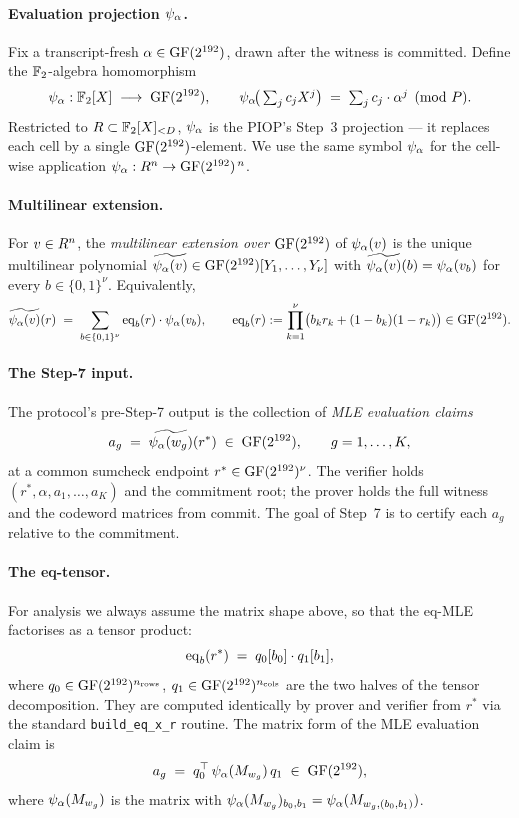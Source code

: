 \paragraph{Evaluation projection $\psi_{\alpha}$.} Fix a transcript-fresh
$\alpha \in \mathrm{GF}(2^{192})$, drawn after the witness is committed. Define the
$\mathbb{F}_2$-algebra homomorphism
\[
  \psi_{\alpha} : \mathbb{F}_2[X] \;\longrightarrow\; \mathrm{GF}(2^{192}),
  \qquad
  \psi_{\alpha}\!\big(\textstyle\sum_j c_j X^j\big) \;=\; \sum_j c_j \cdot \alpha^j \pmod{P}.
\]
Restricted to $R \subset \mathbb{F}_2[X]_{<D}$, $\psi_{\alpha}$ is the
PIOP's Step~3 projection — it replaces each cell by a single
$\mathrm{GF}(2^{192})$-element. We use the same symbol $\psi_{\alpha}$ for the cell-wise
application $\psi_{\alpha} : R^n \to \mathrm{GF}(2^{192})^{\,n}$.

\paragraph{Multilinear extension.} For $v \in R^n$, the
\emph{multilinear extension over $\mathrm{GF}(2^{192})$} of $\psi_{\alpha}(v)$ is the
unique multilinear polynomial $\widetilde{\psi_{\alpha}(v)} \in \mathrm{GF}(2^{192})[Y_1,\ldots,Y_\nu]$
with $\widetilde{\psi_{\alpha}(v)}(b) = \psi_{\alpha}(v_b)$ for every $b \in \{0,1\}^\nu$.
Equivalently,
\[
  \widetilde{\psi_{\alpha}(v)}(r) \;=\; \sum_{b \in \{0,1\}^\nu} \operatorname{eq}_b(r) \cdot \psi_{\alpha}(v_b),
  \qquad
  \operatorname{eq}_b(r) := \prod_{k=1}^\nu \bigl(b_k r_k + (1 - b_k)(1 - r_k)\bigr) \in \mathrm{GF}(2^{192}).
\]

\paragraph{The Step-7 input.} The protocol's pre-Step-7 output is the
collection of \emph{MLE evaluation claims}
\[
  a_g \;=\; \widetilde{\psi_{\alpha}(w_g)}(r^*) \;\in\; \mathrm{GF}(2^{192}),
  \qquad g = 1,\ldots,K,
\]
at a common sumcheck endpoint $r^* \in \mathrm{GF}(2^{192})^{\nu}$. The verifier
holds $(r^*, \alpha, a_1, \ldots, a_K)$ and the commitment root; the
prover holds the full witness and the codeword matrices from commit.
The goal of Step~7 is to certify each $a_g$ relative to the
commitment.

\paragraph{The eq-tensor.} For analysis we always assume the matrix
shape above, so that the eq-MLE factorises as a tensor product:
\[
  \operatorname{eq}_b(r^*) \;=\; q_0[b_0]\cdot q_1[b_1],
\]
where $q_0 \in \mathrm{GF}(2^{192})^{n_{\mathrm{rows}}}$, $q_1 \in
\mathrm{GF}(2^{192})^{n_{\mathrm{cols}}}$ are the two halves of the tensor
decomposition. They are computed identically by prover and verifier
from $r^*$ via the standard \texttt{build\_eq\_x\_r} routine. The
matrix form of the MLE evaluation claim is
\[
  a_g \;=\; q_0^{\top}\, \psi_{\alpha}(M_{w_g})\, q_1 \;\in\; \mathrm{GF}(2^{192}),
\]
where $\psi_{\alpha}(M_{w_g})$ is the matrix with $\psi_{\alpha}(M_{w_g})_{b_0, b_1}
= \psi_{\alpha}(M_{w_g, (b_0, b_1)})$.

